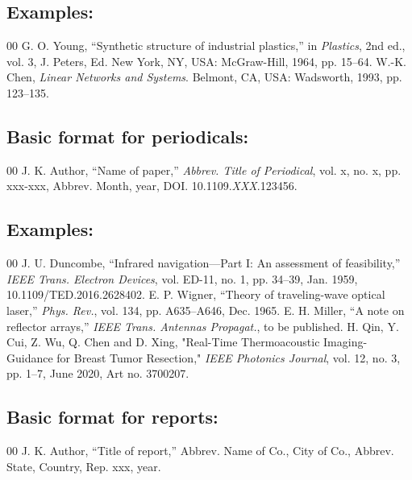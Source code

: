 \documentclass{IEEEtran}
\begin{document}
\subsection*{Examples:}

\begin{thebibliography}{00}
 G. O. Young, ``Synthetic structure of industrial
plastics,'' in \emph{Plastics}, 2nd ed., vol. 3, J. Peters, Ed. New York, NY, USA: McGraw-Hill, 1964, pp. 15--64.
 W.-K. Chen, \emph{Linear Networks and Systems}. Belmont, CA, USA: Wadsworth, 1993, pp. 123--135.
\end{thebibliography}

\subsection*{Basic format for periodicals:}

\begin{thebibliography}{00}
 J. K. Author, ``Name of paper,'' \textit{Abbrev. Title of Periodical}, vol. x, no. x, pp. xxx-xxx, Abbrev. Month, year, DOI.
10.1109.\textit{XXX}.123456.
\end{thebibliography}

\subsection*{Examples:}

\begin{thebibliography}{00}
 J. U. Duncombe, ``Infrared navigation---Part I: An
assessment of feasibility,'' \emph{IEEE Trans. Electron Devices}, vol. ED-11, no. 1, pp. 34--39, Jan. 1959, 10.1109/TED.2016.2628402.
 E. P. Wigner, ``Theory of traveling-wave optical laser,'' 
\emph{Phys. Rev.}, vol. 134, pp. A635--A646, Dec. 1965.
 E. H. Miller, ``A note on reflector arrays,'' \emph{IEEE
Trans. Antennas Propagat.}, to be published.
 H. Qin, Y. Cui, Z. Wu, Q. Chen and D. Xing, "Real-Time
Thermoacoustic Imaging-Guidance for Breast Tumor Resection," \emph{IEEE Photonics Journal}, vol. 12, no. 3, pp. 1--7, June 2020, Art no. 3700207.
\end{thebibliography}

\subsection*{Basic format for reports:}

\begin{thebibliography}{00}
 J. K. Author, ``Title of report,'' Abbrev. Name of Co., City of Co., Abbrev.
State, Country, Rep. {xxx}, year.
\end{thebibliography}
\end{document}
